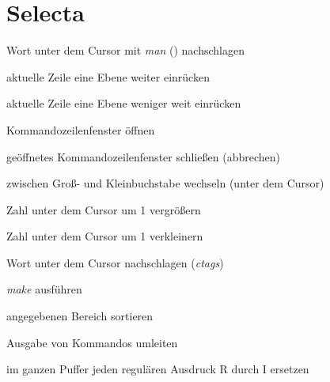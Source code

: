 \documentclass
[
  draft    = true,
  fontsize = 11pt,
  parskip  = half,
  BCOR     = 0pt,
  DIV      = calc,
  ngerman
]
{scrartcl}
\begin{document}
\section{Selecta}
\begin{mytemize}
  \renewcommand{\cmdwidth}{5em}%
  \item {}               Wort unter dem Cursor mit \textit{man} () nachschlagen
  \item \vimcmd{}{{>}{>}}{}          aktuelle Zeile eine Ebene weiter einrücken
  \item \vimcmd{}{{<}{<}}{}          aktuelle Zeile eine Ebene weniger weit einrücken
  \item {}              Kommandozeilenfenster öffnen
  \item {}              geöffnetes Kommandozeilenfenster schließen (abbrechen)
  \item \vimcmd{}{\textasciitilde}{} zwischen Groß- und Kleinbuchstabe wechseln (unter dem Cursor)
  \item {}             Zahl unter dem Cursor um 1 vergrößern
  \item {}             Zahl unter dem Cursor um 1 verkleinern
  \item \vimcmd{}{C-]}{}             Wort unter dem Cursor nachschlagen (\textit{ctags})
  \item {}           \textit{make} ausführen
  \item {}           angegebenen Bereich sortieren
  \item {}          Ausgabe von Kommandos umleiten
  \item {}      im ganzen Puffer jeden regulären Ausdruck R durch I ersetzen
\end{mytemize}

\end{document}
